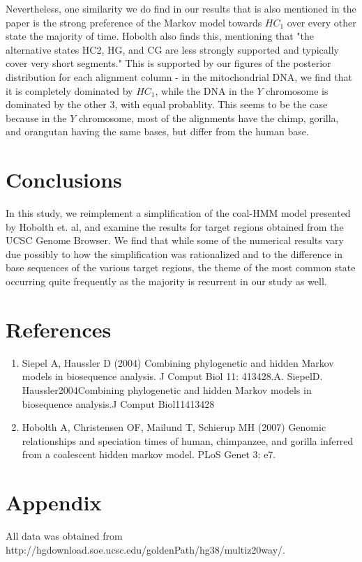 \documentclass[12pt]{article}
\begin{document}
    Nevertheless, one similarity we do find in our results that is also mentioned in the paper is the strong preference of the Markov model towards $HC_1$ over every other state the majority of time. Hobolth also finds this, mentioning that "the alternative states HC2, HG, and CG are less strongly supported and typically cover very short segments." This is supported by our figures of the posterior distribution for each alignment column - in the mitochondrial DNA, we find that it is completely dominated by $HC_1$, while the DNA in the $Y$ chromosome is dominated by the other 3, with equal probablity. This seems to be the case because in the $Y$ chromosome, most of the alignments have the chimp, gorilla, and orangutan having the same bases, but differ from the human base.
    
    \section{Conclusions}
    In this study, we reimplement a simplification of the coal-HMM model presented by Hobolth et. al, and examine the results for target regions obtained from the UCSC Genome Browser. We find that while some of the numerical results vary due possibly to how the simplification was rationalized and to the difference in base sequences of the various target regions, the theme of the most common state occurring quite frequently as the majority is recurrent in our study as well.
    \section{References}
    \begin{enumerate}
    \item Siepel A, Haussler D (2004) Combining phylogenetic and hidden Markov models in biosequence
            analysis. J Comput Biol 11: 413428.A. SiepelD. Haussler2004Combining phylogenetic
            and hidden Markov models in biosequence analysis.J Comput Biol11413428
    \item Hobolth A, Christensen OF, Mailund T, Schierup MH (2007) Genomic relationships and
            speciation times of human, chimpanzee, and gorilla inferred from a coalescent hidden
            markov model. PLoS Genet 3: e7.
    \end{enumerate}
    \section{Appendix}
    All data was obtained from http://hgdownload.soe.ucsc.edu/goldenPath/hg38/multiz20way/.
    
\end{document}
